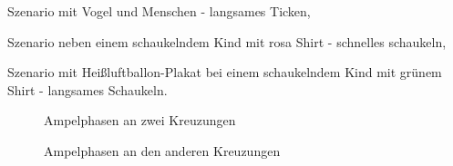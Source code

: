 \documentclass{Bericht}
\begin{document}
Szenario mit Vogel und Menschen - langsames Ticken,

Szenario neben einem schaukelndem Kind mit rosa Shirt - schnelles schaukeln,

Szenario mit Heißluftballon-Plakat bei einem schaukelndem Kind mit grünem Shirt - langsames Schaukeln. \\

\begin{figure}[H]
	\caption{Ampelphasen an zwei Kreuzungen}
	\label{img:ampelphasen-1}
\end{figure}

\begin{figure}[H]
	\caption{Ampelphasen an den anderen Kreuzungen}
	\label{img:ampelphasen-2}
\end{figure}
\end{document}

